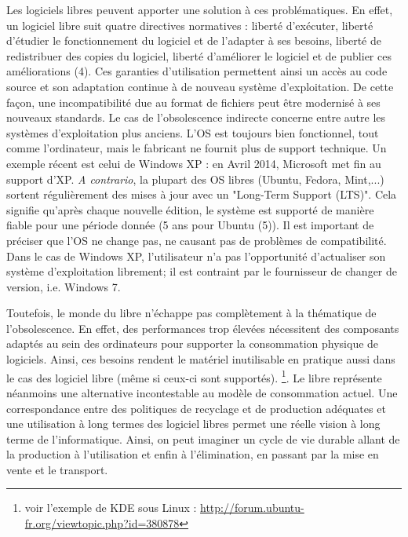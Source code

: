 \documentclass[10pt]{../fiche}
\begin{document}
Les logiciels libres peuvent apporter une solution à ces problématiques. En effet, un logiciel libre suit quatre directives normatives : liberté d'exécuter, liberté d'étudier le fonctionnement du logiciel et de l'adapter à ses besoins, liberté de redistribuer des copies du logiciel, liberté d'améliorer le logiciel et de publier ces améliorations (4). Ces garanties d'utilisation permettent ainsi un accès au code source et son adaptation continue à de nouveau système d'exploitation. De cette façon, une incompatibilité due au format de fichiers peut être modernisé à ses nouveaux standards. Le cas de l'obsolescence indirecte concerne entre autre les systèmes d'exploitation plus anciens. L'OS est toujours bien fonctionnel, tout comme l'ordinateur, mais le fabricant ne fournit plus de support technique. Un exemple récent est celui de \textsf{Windows XP} : en Avril 2014, \textsf{Microsoft} met fin au support d'\textsf{XP}. \textit{A contrario}, la plupart des OS libres (\textsf{Ubuntu, Fedora, Mint,...}) sortent régulièrement des mises à jour avec un "Long-Term Support (LTS)". Cela signifie qu'après chaque nouvelle édition, le système est supporté de manière fiable pour une période donnée (5 ans pour \textsf{Ubuntu} (5)). Il est important de préciser que l'OS ne change pas, ne causant pas de problèmes de compatibilité. Dans le cas de \textsf{Windows XP}, l'utilisateur n'a pas l'opportunité d'actualiser son système d'exploitation librement; il est contraint par le fournisseur de changer de version, i.e. \textsf{Windows 7}.

Toutefois, le monde du libre n'échappe pas complètement à la thématique de l'obsolescence. En effet, des performances trop élevées nécessitent des composants adaptés au sein des ordinateurs pour supporter la consommation physique de logiciels. Ainsi, ces besoins rendent le matériel inutilisable en pratique aussi dans le cas des logiciel libre (même si ceux-ci sont supportés). \footnote{voir l'exemple de \textsf{KDE} sous \textsf{Linux} : \url{http://forum.ubuntu-fr.org/viewtopic.php?id=380878}}. Le libre représente néanmoins une alternative incontestable au modèle de consommation actuel. Une correspondance entre des politiques de recyclage et de production adéquates et une utilisation à long termes des logiciel libres permet une réelle vision à long terme de l'informatique. Ainsi, on peut imaginer un cycle de vie durable allant de la production à l'utilisation et enfin à l'élimination, en passant par la mise en vente et le transport.
\end{document}
